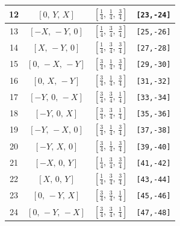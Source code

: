 \documentclass[fleqn,8pt]{jsarticle}
\begin{document}
\begin{longtable}{cccc}
12 & $\left[ 0,\, Y,\, X \right]$ & $\left[ \frac{1}{4},\, \frac{1}{4},\, \frac{3}{4} \right]$ & {\tt [23,-24]} \\ \hline
13 & $\left[ - X,\, - Y,\, 0 \right]$ & $\left[ \frac{1}{4},\, \frac{3}{4},\, \frac{3}{4} \right]$ & {\tt [25,-26]} \\ \hline
14 & $\left[ X,\, - Y,\, 0 \right]$ & $\left[ \frac{1}{4},\, \frac{3}{4},\, \frac{3}{4} \right]$ & {\tt [27,-28]} \\ \hline
15 & $\left[ 0,\, - X,\, - Y \right]$ & $\left[ \frac{3}{4},\, \frac{1}{4},\, \frac{3}{4} \right]$ & {\tt [29,-30]} \\ \hline
16 & $\left[ 0,\, X,\, - Y \right]$ & $\left[ \frac{3}{4},\, \frac{1}{4},\, \frac{3}{4} \right]$ & {\tt [31,-32]} \\ \hline
17 & $\left[ - Y,\, 0,\, - X \right]$ & $\left[ \frac{3}{4},\, \frac{3}{4},\, \frac{1}{4} \right]$ & {\tt [33,-34]} \\ \hline
18 & $\left[ - Y,\, 0,\, X \right]$ & $\left[ \frac{3}{4},\, \frac{3}{4},\, \frac{1}{4} \right]$ & {\tt [35,-36]} \\ \hline
19 & $\left[ - Y,\, - X,\, 0 \right]$ & $\left[ \frac{3}{4},\, \frac{1}{4},\, \frac{3}{4} \right]$ & {\tt [37,-38]} \\ \hline
20 & $\left[ - Y,\, X,\, 0 \right]$ & $\left[ \frac{3}{4},\, \frac{1}{4},\, \frac{3}{4} \right]$ & {\tt [39,-40]} \\ \hline
21 & $\left[ - X,\, 0,\, Y \right]$ & $\left[ \frac{1}{4},\, \frac{3}{4},\, \frac{3}{4} \right]$ & {\tt [41,-42]} \\ \hline
22 & $\left[ X,\, 0,\, Y \right]$ & $\left[ \frac{1}{4},\, \frac{3}{4},\, \frac{3}{4} \right]$ & {\tt [43,-44]} \\ \hline
23 & $\left[ 0,\, - Y,\, X \right]$ & $\left[ \frac{3}{4},\, \frac{3}{4},\, \frac{1}{4} \right]$ & {\tt [45,-46]} \\ \hline
24 & $\left[ 0,\, - Y,\, - X \right]$ & $\left[ \frac{3}{4},\, \frac{3}{4},\, \frac{1}{4} \right]$ & {\tt [47,-48]} \\
\end{longtable}
\renewcommand{\arraystretch}{1.2}
\end{document}
